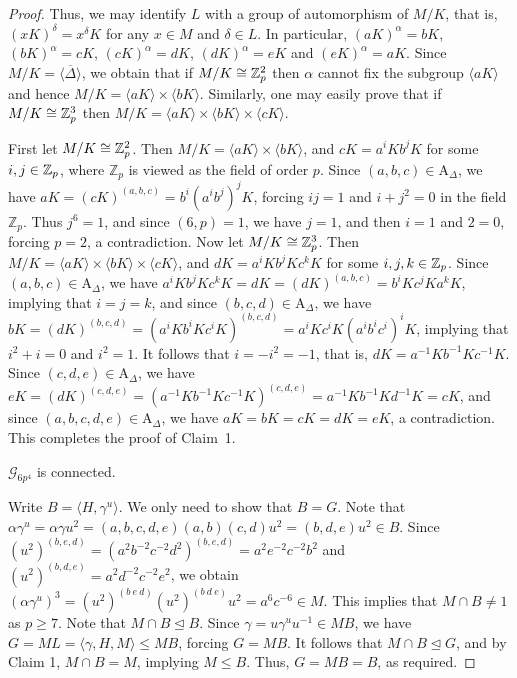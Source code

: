 \documentclass[12pt,reqno]{amsart}
\renewcommand\a{\alpha}  \renewcommand\b{\beta}
\newcommand\A{\mathrm{A}} \newcommand\AGL{\mathrm{AGL}} \newcommand\AGammaL{\mathrm{A\Gamma L}} \newcommand\Alt{\mathrm{Alt}} \newcommand\ASL{\mathrm{ASL}} \newcommand\ASigmaL{\mathrm{A \Sigma L}} \newcommand\Aut{\mathrm{Aut}}
\newcommand\mz{\mathbb{Z}}
\newcommand{\cG}{\mathcal{G}}
\numberwithin {equation} {section}
\begin{document}
\begin{proof}
Thus, we may identify $L$ with a group of automorphism of $M/K$, that is, $(xK)^\delta=x^\delta K$ for any $x\in M$ and $\delta\in L$. In particular, $(aK)^\a=bK$, $(bK)^\a=cK$, $(cK)^\a=dK$, $(dK)^\a=eK$ and $(eK)^\a=aK$. Since $M/K=\langle \overline{\Delta}\rangle$, we obtain that if $M/K\cong \mathbb{Z}_p^2$ then $\a$ cannot fix the subgroup $\langle aK\rangle$ and hence $M/K=\langle aK\rangle\times\langle bK\rangle$. Similarly, one may easily prove that if $M/K\cong \mathbb{Z}_p^3$ then $M/K=\langle aK\rangle\times\langle bK\rangle\times\langle cK\rangle $.

First let $M/K\cong \mathbb{Z}_p^2$. Then $M/K=\langle aK\rangle\times\langle bK\rangle$, and $cK=a^iKb^jK$ for some $i,j\in\mathbb{Z}_p$, where $\mz_p$ is viewed as the field of order $p$. Since $(a,b,c)\in \A_\Delta$, we have $aK=(cK)^{(a,b,c)}=b^i(a^ib^j)^jK$, forcing $ij=1$ and $i+j^2=0$ in the field $\mz_p$. Thus $j^6=1$,  and since $(6,p)=1$, we have $j=1$, and then $i=1$ and $2=0$, forcing $p=2$, a contradiction. Now let $M/K\cong \mathbb{Z}_p^3$. Then $M/K=\langle aK\rangle\times\langle bK\rangle\times\langle cK\rangle$, and $dK=a^iKb^jKc^k K$ for some $i,j,k\in \mathbb{Z}_p$. Since $(a, b,c)\in \A_\Delta$, we have $a^iKb^jKc^k K=dK=(dK)^{(a,b,c)}=b^iKc^jKa^kK$, implying that $i=j=k$, and  since $(b,c,d)\in \A_\Delta$, we have $bK=(dK)^{(b,c,d)}=(a^iKb^iKc^iK)^{(b,c,d)}=a^iKc^iK(a^ib^ic^i)^iK$, implying that $i^2+i=0$ and $i^2=1$. It follows that $i=-i^2=-1$, that is, $dK=a^{-1}Kb^{-1}Kc^{-1}K$.  Since
$(c,d,e) \in \A_\Delta$, we have $eK=(dK)^{(c,d,e)}=(a^{-1}Kb^{-1}Kc^{-1}K)^{(c,d,e)}=a^{-1}Kb^{-1}Kd^{-1}K=cK$, and since $(a,b,c,d,e)\in \A_\Delta$, we have $aK=bK=cK=dK=eK$, a contradiction. This completes the proof of Claim~1.



\vskip 0.2cm
 $\cG_{6p^4}$ is connected.

Write $B=\langle H,\gamma^u\rangle$. We only need to show that $B=G$. Note that $\alpha \gamma^u=\alpha \gamma u^2=(a,b,c,d,e)(a,b)(c,d)u^2=(b,d,e)u^2\in B$. Since $(u^2)^{(b,e,d)}=(a^2b^{-2}c^{-2}d^2)^{(b,e,d)}=a^2e^{-2}c^{-2}b^2$ and $(u^2)^{(b, d,e)}=a^2d^{-2}c^{-2}e^2$,  we obtain $(\alpha \gamma^u)^3=(u^2)^{(b\ e\ d)}(u^2)^{(b\ d\ e)}u^2=a^6c^{-6}\in M$. This implies that $M\cap B\not=1$ as $p\geq 7$. Note that $M\cap B\unlhd B$. Since $\gamma=u\gamma^u u^{-1}\in MB$, we have  $G=ML=\langle \gamma,H,M\rangle\leq MB$, forcing $G=MB$. It follows that $M\cap B\unlhd G$, and by Claim 1, $M\cap B=M$, implying $M\leq B$. Thus, $G=MB=B$, as required.



\end{proof}
\end{document}
